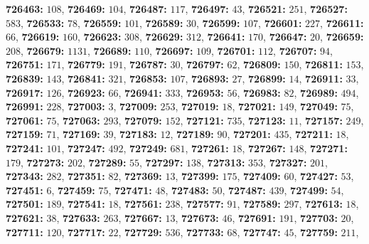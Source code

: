 \textsf{\bfseries 726463:} $108$, \textsf{\bfseries 726469:} $104$, \textsf{\bfseries 726487:} $117$, \textsf{\bfseries 726497:} $43$, \textsf{\bfseries 726521:} $251$, \textsf{\bfseries 726527:} $583$, \textsf{\bfseries 726533:} $78$, \textsf{\bfseries 726559:} $101$, \textsf{\bfseries 726589:} $30$, \textsf{\bfseries 726599:} $107$, \textsf{\bfseries 726601:} $227$, \textsf{\bfseries 726611:} $66$, \textsf{\bfseries 726619:} $160$, \textsf{\bfseries 726623:} $308$, \textsf{\bfseries 726629:} $312$, \textsf{\bfseries 726641:} $170$, \textsf{\bfseries 726647:} $20$, \textsf{\bfseries 726659:} $208$, \textsf{\bfseries 726679:} $1131$, \textsf{\bfseries 726689:} $110$, \textsf{\bfseries 726697:} $109$, \textsf{\bfseries 726701:} $112$, \textsf{\bfseries 726707:} $94$, \textsf{\bfseries 726751:} $171$, \textsf{\bfseries 726779:} $191$, \textsf{\bfseries 726787:} $30$, \textsf{\bfseries 726797:} $62$, \textsf{\bfseries 726809:} $150$, \textsf{\bfseries 726811:} $153$, \textsf{\bfseries 726839:} $143$, \textsf{\bfseries 726841:} $321$, \textsf{\bfseries 726853:} $107$, \textsf{\bfseries 726893:} $27$, \textsf{\bfseries 726899:} $14$, \textsf{\bfseries 726911:} $33$, \textsf{\bfseries 726917:} $126$, \textsf{\bfseries 726923:} $66$, \textsf{\bfseries 726941:} $333$, \textsf{\bfseries 726953:} $56$, \textsf{\bfseries 726983:} $82$, \textsf{\bfseries 726989:} $494$, \textsf{\bfseries 726991:} $228$, \textsf{\bfseries 727003:} $3$, \textsf{\bfseries 727009:} $253$, \textsf{\bfseries 727019:} $18$, \textsf{\bfseries 727021:} $149$, \textsf{\bfseries 727049:} $75$, \textsf{\bfseries 727061:} $75$, \textsf{\bfseries 727063:} $293$, \textsf{\bfseries 727079:} $152$, \textsf{\bfseries 727121:} $735$, \textsf{\bfseries 727123:} $11$, \textsf{\bfseries 727157:} $249$, \textsf{\bfseries 727159:} $71$, \textsf{\bfseries 727169:} $39$, \textsf{\bfseries 727183:} $12$, \textsf{\bfseries 727189:} $90$, \textsf{\bfseries 727201:} $435$, \textsf{\bfseries 727211:} $18$, \textsf{\bfseries 727241:} $101$, \textsf{\bfseries 727247:} $492$, \textsf{\bfseries 727249:} $681$, \textsf{\bfseries 727261:} $18$, \textsf{\bfseries 727267:} $148$, \textsf{\bfseries 727271:} $179$, \textsf{\bfseries 727273:} $202$, \textsf{\bfseries 727289:} $55$, \textsf{\bfseries 727297:} $138$, \textsf{\bfseries 727313:} $353$, \textsf{\bfseries 727327:} $201$, \textsf{\bfseries 727343:} $282$, \textsf{\bfseries 727351:} $82$, \textsf{\bfseries 727369:} $13$, \textsf{\bfseries 727399:} $175$, \textsf{\bfseries 727409:} $60$, \textsf{\bfseries 727427:} $53$, \textsf{\bfseries 727451:} $6$, \textsf{\bfseries 727459:} $75$, \textsf{\bfseries 727471:} $48$, \textsf{\bfseries 727483:} $50$, \textsf{\bfseries 727487:} $439$, \textsf{\bfseries 727499:} $54$, \textsf{\bfseries 727501:} $189$, \textsf{\bfseries 727541:} $18$, \textsf{\bfseries 727561:} $238$, \textsf{\bfseries 727577:} $91$, \textsf{\bfseries 727589:} $297$, \textsf{\bfseries 727613:} $18$, \textsf{\bfseries 727621:} $38$, \textsf{\bfseries 727633:} $263$, \textsf{\bfseries 727667:} $13$, \textsf{\bfseries 727673:} $46$, \textsf{\bfseries 727691:} $191$, \textsf{\bfseries 727703:} $20$, \textsf{\bfseries 727711:} $120$, \textsf{\bfseries 727717:} $22$, \textsf{\bfseries 727729:} $536$, \textsf{\bfseries 727733:} $68$, \textsf{\bfseries 727747:} $45$, \textsf{\bfseries 727759:} $211$, 
